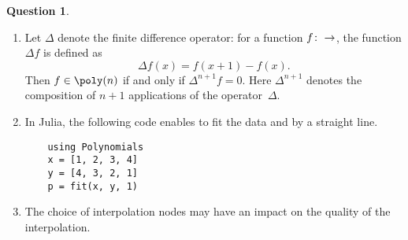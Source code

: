 \documentclass[10pt]{article}
\theoremstyle{definition}
\newtheorem{question}{Question}
\theoremstyle{remark}
\begin{document}
\begin{question}
\begin{enumerate}
        \item
            Let $\Delta$ denote the finite difference operator:
            for a function $f \colon \real \to \real$,
            the function $\Delta f$ is defined as
            \[
                \Delta f(x) = f(x + 1) - f(x).
            \]
            Then $f \in \poly(n)$ if and only if $\Delta^{n+1} f = 0$.
            Here $\Delta^{n+1}$ denotes the composition of $n+1$ applications of the operator~$\Delta$.

        \item
            In Julia, the following code enables to fit the data  and  by a straight line.
            \begin{verbatim}
    using Polynomials
    x = [1, 2, 3, 4]
    y = [4, 3, 2, 1]
    p = fit(x, y, 1)
            \end{verbatim}

        \item
            The choice of interpolation nodes may have an impact on the quality of the interpolation.
\end{enumerate}
\end{question}
\end{document}
